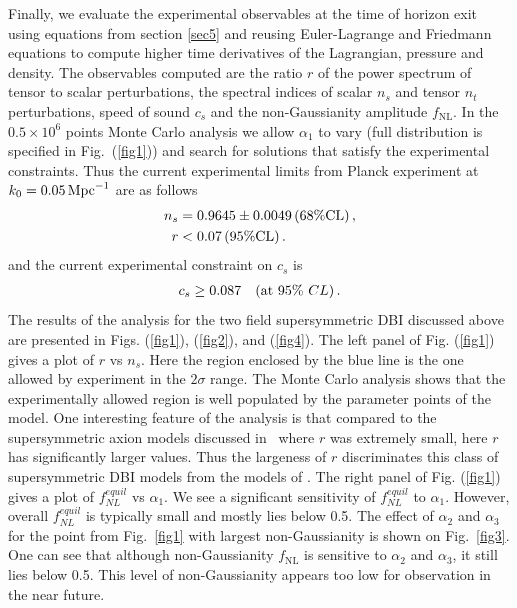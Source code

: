 \documentclass[a4paper,11pt]{article}
\def\non{\nonumber\\}
\def\non{\nonumber\\}
\begin{document}
  Finally, we evaluate the experimental observables at the time of horizon exit using equations from section \ref{sec5} and reusing Euler-Lagrange and Friedmann equations to compute higher time derivatives of the Lagrangian, pressure and density. The observables computed are the ratio $r$ of the power spectrum of tensor to scalar perturbations, the spectral indices of scalar $n_s$ and tensor $n_t$ perturbations, 
 speed of sound $c_s$ 
  and the non-Gaussianity amplitude $f_\text{NL}$.
    In the $0.5 \times 10^6$ points Monte Carlo analysis we allow $\alpha_1$ to vary
  (full distribution is specified in Fig.~(\ref{fig1}))
  and search for solutions that satisfy the experimental constraints. Thus the
  current experimental limits from Planck experiment at $k_0=0.05\, {\rm Mpc}^{-1}$ are as follows~\cite{Adam:2015rua,Ade:2015lrj,Array:2015xqh}
  \begin{align}
  	n_s& = 0.9645 \pm 0.0049\, (68\% {\rm CL})\,, \non
  	r & <0.07\, (95\% {\rm CL})\,.
  	\label{data}
  \end{align}
  and the current experimental constraint on $c_s$ is~\cite{Ade:2015lrj}
  \begin{align}
  	c_s\geq 0.087~~~({\rm at ~}95\% ~CL)\,.
  	\label{sound}
  \end{align}
  The results of the analysis for the two field supersymmetric DBI discussed above
  are presented in Figs. (\ref{fig1}), (\ref{fig2}), and (\ref{fig4}). The left panel of Fig. (\ref{fig1}) gives
  a plot of $r$ vs $n_s$. Here the region enclosed by the blue line is the one allowed by experiment in the $2\sigma$ range.
  The Monte Carlo analysis shows that the experimentally allowed region is well populated by the parameter points of the model.
  One interesting feature of the analysis is that compared to the
  supersymmetric axion models discussed in~\cite{Nath:2017ihp}
  where $r$ was extremely small, here $r$ has significantly
  larger values. Thus the largeness of $r$ discriminates this class of supersymmetric DBI models from the models
  of \cite{Nath:2017ihp}.
  The right panel of Fig. (\ref{fig1}) gives a plot of $f^{equil}_{NL}$ vs $\alpha_1$. We see a significant sensitivity
  of $f^{equil}_{NL}$ to $\alpha_1$. However, overall $f^{equil}_{NL}$ is typically small and mostly lies below 0.5. The effect of $\alpha_2$ and $\alpha_3$ for the point from Fig.~\ref{fig1} with largest non-Gaussianity is shown on Fig.~\ref{fig3}. One can see that although non-Gaussianity $f_\text{NL}$ is sensitive to $\alpha_2$ and $\alpha_3$, it still lies below 0.5. This level
  of non-Gaussianity appears too low for observation in the near future.
\end{document}
